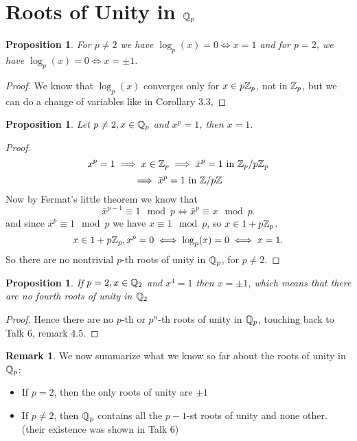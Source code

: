 \documentclass[a4paper]{article}
\theoremstyle{plain}
\newtheorem{prop}[thm]{Proposition}
\theoremstyle{definition}
\newtheorem{rem}[thm]{Remark}
\begin{document}
\section{Roots of Unity in $\Bbb Q_{p}$}
\begin{prop}
  For $p \neq 2$ we have $\log_{p}(x)=0 \iff x=1$ and for $p = 2$, we have $\log_{p}(x)=0 \iff x= \pm 1$.
\end{prop}
\begin{proof}
  We know that $\log_{p}(x)$ converges only for $x \in p\Bbb Z_{p}$, not in $\Bbb Z_{p}$, but we can do a change of variables like in Corollary 3.3,

\end{proof}
\begin{prop}
  Let $p \neq 2, x \in \Bbb Q_{p}$ and $x^{p}=1$, then $x=1$.
\end{prop}
\begin{proof}
  $$x^{p} = 1 \implies x \in \Bbb Z_{p} \implies \bar x^{p} = 1 \text{ in } \Bbb Z_{p}/p\Bbb Z_{p}$$
  $$\implies \bar x^{p} = 1 \text{ in } \Bbb Z/p\Bbb Z$$
  Now by Fermat's little theorem we know that
  $$\bar x^{p-1} \equiv 1 \mod p \iff \bar x^{p} \equiv x \mod p.$$
  and since $\bar x^{p} \equiv 1 \mod p$ we have $x \equiv 1 \mod p$, so $x \in 1+p\Bbb Z_{p}$.
  $$x \in 1+p\Bbb Z_{p}, x^{p} = 0 \iff \log_{p}(x) = 0 \iff x = 1.$$
  So there are no nontrivial $p$-th roots of unity in $\Bbb Q_{p}$, for $p \neq 2$.
\end{proof}
\begin{prop} If $p = 2, x \in \Bbb Q_{2}$ and $x^{4} = 1$ then $x = \pm 1$, which means that there are no fourth roots of unity in $\Bbb Q_{2}$
\end{prop}
\begin{proof}
  Hence there are no $p$-th or $p^{n}$-th roots of unity in $\Bbb Q_{p}$, touching back to Talk 6, remark 4.5.
\end{proof}
\begin{rem}
  We now summarize what we know so far about the roots of unity in $\Bbb Q_{p}$:
  \begin{itemize}
    \item If $p=2$, then the only roots of unity are $\pm 1$
    \item If $p \neq 2$, then $\Bbb Q_{p}$ contains all the $p-1$-st roots of unity and none other. (their existence was shown in Talk 6)
  \end{itemize}

\end{rem}
\end{document}
